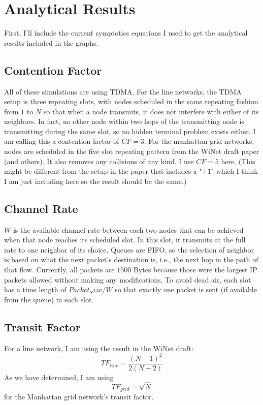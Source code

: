 \documentclass[conference]{IEEEtran}
\begin{document}
\section{Analytical Results}

First, I'll include the current symptotics equations I used to get the analytical results included in the graphs. 

\subsection{Contention Factor}
All of these simulations are using TDMA.  For the line networks, the TDMA setup is three repeating slots, with nodes scheduled in the same repeating fashion from $1$ to $N$ so that when a node transmits, it does not interfere with either of its neighbors.  In fact, no other node within two hops of the transmitting node is transmitting during the same slot, so no hidden terminal problem exists either.  I am calling this a contention factor of $CF = 3$.  For the manhattan grid networks, nodes are scheduled in the five slot repeating pattern from the WiNet draft paper (and others).  It also removes any collisions of any kind.  I use $CF = 5$ here.  (This might be different from the setup in the paper that includes a "$+1$" which I think I am just including here so the result should be the same.)

\subsection{Channel Rate}
$W$ is the available channel rate between each two nodes that can be achieved when that node reaches its scheduled slot.  In this slot, it transmits at the full rate to one neighbor of its choice.  Queues are FIFO, so the selection of neighbor is based on what the next packet's destination is, i.e., the next hop in the path of that flow.  Currently, all packets are $1500$ Bytes because those were the largest IP packets allowed without making any modifications.  To avoid dead air, each slot has a time length of $Packet_Size/W$ so that exactly one packet is sent (if available from the queue) in each slot.

\subsection{Transit Factor}
For a line network, I am using the result in the WiNet draft:
\begin{equation}
	TF_{line} = \frac{(N-1)^2}{2(N-2)}
\end{equation}
As we have determined, I am using 
\begin{equation}
	TF_{grid} = \sqrt{N}
\end{equation}
for the Manhattan grid network's transit factor.
\end{document}
